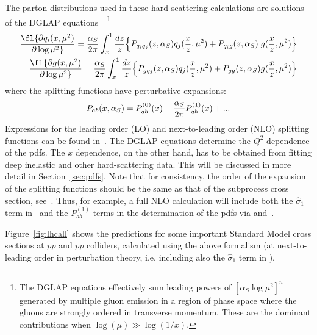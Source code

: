 \documentclass[12pt]{iopart}
\def\beq{\begin{equation}}
\def\eeq{\end{equation}}
\def\beqn{\begin{eqnarray}}
\def\eeqn{\end{eqnarray}}
\def\as{\alpha_S}
\def\sighat{\hat{\sigma}}
\begin{document}
The parton distributions used in these hard-scattering calculations are solutions of the DGLAP
equations~\cite{DGLAP}~\footnote{The DGLAP equations effectively sum leading powers of $[\as \log \mu^2]^n$
generated by multiple gluon emission in a region of phase space where the gluons are strongly ordered in
transverse momentum. These are the dominant contributions when $\log(\mu)\gg \log(1/x)$.} 
\beqn 
\fl
{\partial q_i(x,\mu^2) \over \partial \log \mu^2} = {\as\over 2\pi} 
\int_x^1 \frac{dz}{z} \Big\{
    P_{q_i q_j}(z,\as) q_j(\frac{x}{z},\mu^2)
     +  P_{q_i g}(z,\as)\; g(\frac{x}{z},\mu^2)
    \Big\}    \nonumber \\
\fl
 {\partial g(x,\mu^2) \over \partial \log \mu^2} =  {\as\over 2\pi} \int_x^1
\frac{dz}{z} \Big\{
    P_{g q_j}(z,\as) q_j(\frac{x}{z},\mu^2)  +
    P_{g g}(z,\as) g(\frac{x}{z},\mu^2)
    \Big\}
\label{eq:DGLAP}
\eeqn
where the splitting functions have perturbative expansions: 
\beq
 P_{ab}(x,\as) = P_{ab}^{(0)}(x) + {\as\over 2\pi} P_{ab}^{(1)}(x) + ...
\label{eq:splitting}
\eeq
Expressions for the leading order (LO) and next-to-leading order (NLO) splitting functions can be found in~\cite{Ellis:1991qj}.
The DGLAP equations
determine the $Q^2$ dependence of the pdfs. The $x$ dependence, on the other hand, has to be obtained from
fitting deep inelastic and other hard-scattering data. This will be discussed in more
detail in Section~\ref{sec:pdfs}. Note that for consistency, the order of the expansion of the splitting
functions should be the same as that of the
subprocess cross section, see~. Thus, for example, a full NLO calculation will include both
the $\sighat_1$ term in~ and the $P_{ab}^{(1)}$ terms in the determination of the pdfs via
 and~.

Figure~\ref{fig:lhcall} shows the predictions for
some important Standard Model cross sections at  $p \bar p$ and  $pp$  colliders, calculated
using the above formalism (at next-to-leading order in perturbation theory, i.e. including also the 
$\sighat_1$ term in ). 
\end{document}

